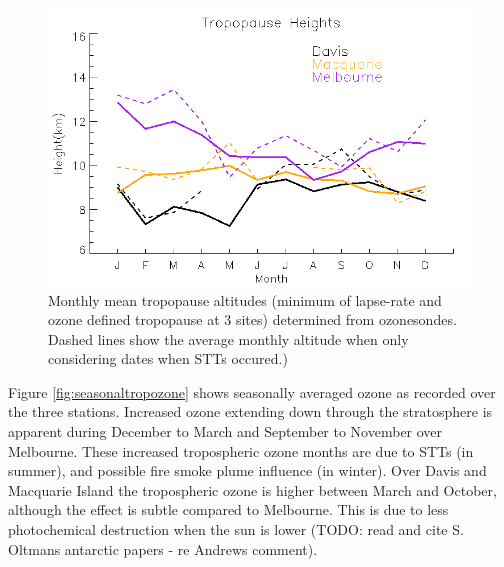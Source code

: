 \documentclass{article}
\begin{document}
    \begin{figure}[!htbp]
	\begin{center}
	\includegraphics[width=0.8\columnwidth]{figures/tpheights}
	\caption{Monthly mean tropopause altitudes (minimum of lapse-rate and ozone defined tropopause at 3 sites) determined from ozonesondes.
	Dashed lines show the average monthly altitude when only considering dates when STTs occured.) 
	}
	\label{fig:seasonaltpheights}
	\end{center}
    \end{figure}

    Figure \ref{fig:seasonaltropozone} shows seasonally averaged ozone as recorded over the three stations.
    Increased ozone extending down through the stratosphere is apparent during December to March and September to November over Melbourne.
    These increased tropospheric ozone months are due to STTs (in summer), and possible fire smoke plume influence (in winter).
    Over Davis and Macquarie Island the tropospheric ozone is higher between March and October, although the effect is subtle compared to Melbourne.
    This is due to less photochemical destruction when the sun is lower (TODO: read and cite S. Oltmans antarctic papers - re Andrews comment).
    
\end{document}
